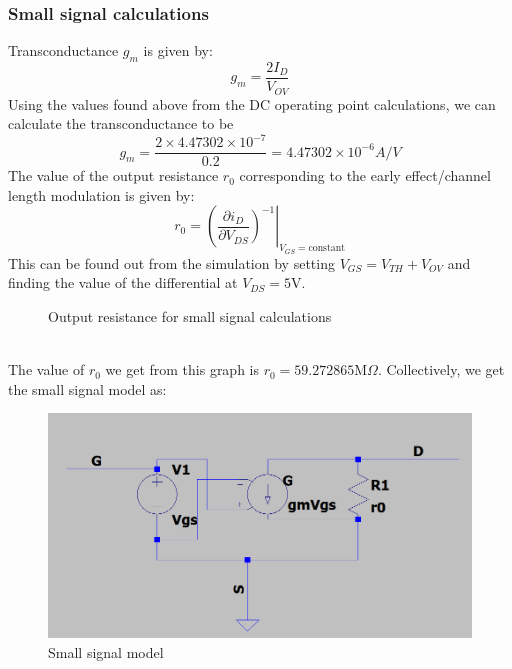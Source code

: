 \documentclass{report}[12pt]
\begin{document}
\subsubsection*{Small signal calculations}
Transconductance $g_m$ is given by:
$$g_m=\frac{2I_D}{V_{OV}}$$
Using the values found above from the DC operating point calculations, we can calculate the transconductance to be
$$g_m=\frac{2\times4.47302\times10^{-7}}{0.2}=4.47302\times10^{-6}A/V$$
The value of the output resistance $r_0$ corresponding to the early effect/channel length modulation is given by:
$$r_0=\left(\left.\frac{\partial i_D}{\partial V_{DS}}\right)^{-1}\right|_{V_{GS}=\mathrm{constant}}$$
This can be found out from the simulation by setting $V_{GS}=V_{TH}+V_{OV}$ and finding the value of the differential at $V_{DS}=5$V.
\begin{figure}[ht]
    \centering
    \caption{Output resistance for small signal calculations}
    \label{fig:r0}
\end{figure}\\
The value of $r_0$ we get from this graph is $r_0=59.272865\mathrm{M}\Omega$.
Collectively, we get the small signal model as:
\begin{figure}[ht]
    \centering
    \includegraphics[scale=0.35]{resources/ssmodel.png}
    \caption{Small signal model}
    \label{fig:small_signal}
\end{figure}
\newpage
\end{document}
